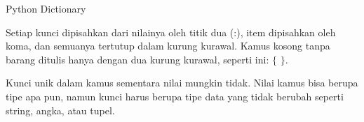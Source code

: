 \documentclass[a4paper,12pt]{report}
\begin{document}
\sloppy
\begin{center}{\fontsize{24pt}{24pt}\selectfont Python Dictionary \\}\end{center} \par
\vspace{12pt}
\noindent 
Setiap kunci dipisahkan dari nilainya oleh titik dua (:), item dipisahkan oleh koma, dan semuanya tertutup dalam kurung kurawal. Kamus kosong tanpa barang ditulis hanya dengan dua kurung kurawal, seperti ini:  $  \{  $ $  \}  $. \par
\noindent 
Kunci unik dalam kamus sementara nilai mungkin tidak. Nilai kamus bisa berupa tipe apa pun, namun kunci harus berupa tipe data yang tidak berubah seperti string, angka, atau tupel. \par
\vspace{12pt}
\end{document}
